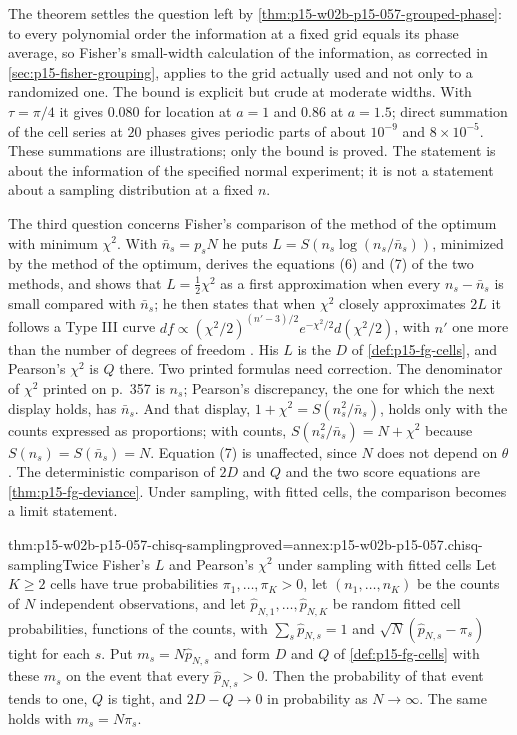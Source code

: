 The theorem settles the question left by
\cref{thm:p15-w02b-p15-057-grouped-phase}: to every polynomial order the
information at a fixed grid equals its phase average, so Fisher's
small-width calculation of the information, as corrected in
\cref{sec:p15-fisher-grouping}, applies to the grid actually used and not
only to a randomized one. The bound is explicit but crude at moderate
widths. With \(\tau=\pi/4\) it gives \(0.080\) for location at \(a=1\) and
\(0.86\) at \(a=1.5\); direct summation of the cell series at \(20\)
phases gives periodic parts of about \(10^{-9}\) and \(8\times10^{-5}\).
These summations are illustrations; only the bound is proved. The
statement is about the information of the specified normal experiment; it
is not a statement about a sampling distribution at a fixed \(n\).

The third question concerns Fisher's comparison of the method of the
optimum with minimum \(\chi^2\). With \(\bar n_s=p_sN\) he puts
\(L=S(n_s\log(n_s/\bar n_s))\), minimized by the method of the optimum,
derives the equations (6) and (7) of the two methods, and shows that
\(L=\tfrac12\chi^2\) as a first approximation when every \(n_s-\bar n_s\)
is small compared with \(\bar n_s\); he then states that when \(\chi^2\)
closely approximates \(2L\) it follows a Type III curve
\(df\propto(\chi^2/2)^{(n'-3)/2}e^{-\chi^2/2}d(\chi^2/2)\), with \(n'\)
one more than the number of degrees of freedom
\cite[pp.~357--358]{Fisher1922Foundations}. His \(L\) is the \(D\) of
\cref{def:p15-fg-cells}, and Pearson's \(\chi^2\) is \(Q\) there. Two
printed formulas need correction. The denominator of \(\chi^2\) printed
on p.~357 is \(n_s\); Pearson's discrepancy, the one for which the next
display holds, has \(\bar n_s\). And that display, \(1+\chi^2=S(n_s^2/\bar
n_s)\), holds only with the counts expressed as proportions; with counts,
\(S(n_s^2/\bar n_s)=N+\chi^2\) because \(S(n_s)=S(\bar n_s)=N\). Equation
(7) is unaffected, since \(N\) does not depend on \(\theta\). The
deterministic comparison of \(2D\) and \(Q\) and the two score equations
are \cref{thm:p15-fg-deviance}. Under sampling, with fitted cells, the
comparison becomes a limit statement.

\begin{hbtheorem}{thm:p15-w02b-p15-057-chisq-sampling}{proved=annex:p15-w02b-p15-057.chisq-sampling}{Twice Fisher's \(L\) and Pearson's \(\chi^2\) under sampling with fitted cells}
Let \(K\geq2\) cells have true probabilities \(\pi_1,\ldots,\pi_K>0\), let
\((n_1,\ldots,n_K)\) be the counts of \(N\) independent observations, and
let \(\hat p_{N,1},\ldots,\hat p_{N,K}\) be random fitted cell
probabilities, functions of the counts, with \(\sum_s\hat p_{N,s}=1\) and
\(\sqrt N(\hat p_{N,s}-\pi_s)\) tight for each \(s\). Put
\(m_s=N\hat p_{N,s}\) and form \(D\) and \(Q\) of \cref{def:p15-fg-cells}
with these \(m_s\) on the event that every \(\hat p_{N,s}>0\). Then the
probability of that event tends to one, \(Q\) is tight, and
\(2D-Q\to0\) in probability as \(N\to\infty\). The same holds with
\(m_s=N\pi_s\).
\end{hbtheorem}

